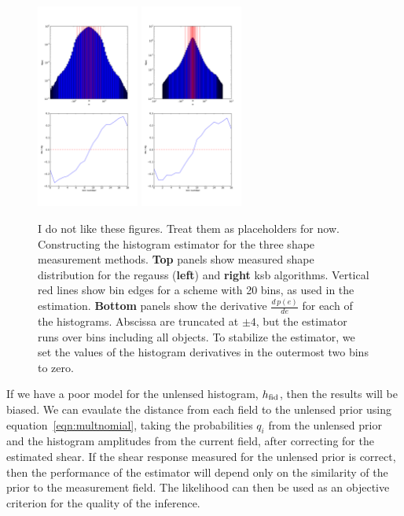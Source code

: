 \documentclass[iop]{emulateapj}
\begin{document}
\begin{figure}
\includegraphics[width=0.3\textwidth]{./Plots/regauss-opt-shear_plots-prior_derivs.png}
\includegraphics[width=0.3\textwidth]{./Plots/ksb-opt-shear_plots-prior_derivs.png}
\caption{I do not like these figures. Treat them as placeholders for now.\\
Constructing the histogram estimator for the three shape measurement methods. {\bf Top} panels show measured shape distribution for the regauss ({\bf left}) and {\bf right} ksb algorithms. Vertical red lines show bin edges for a scheme with 20 bins, as used in the estimation. {\bf Bottom} panels show the derivative $\frac{d\,p(e)}{d{e}}$ for each of the histograms. Abscissa are truncated at $\pm 4$, but the estimator runs over bins including all objects. To stabilize the estimator, we set the values of the histogram derivatives in the outermost two bins to zero.}
\label{fig:estimator}
\end{figure}

If we have a poor model for the unlensed histogram, $h_{\rm fid}$, then the results will be biased. We can evaulate the distance from each field to the unlensed prior using equation~\ref{eqn:multnomial}, taking the probabilities $q_i$ from the unlensed prior and the histogram amplitudes from the current field, {after correcting for the estimated shear}. If the shear response measured for the unlensed prior is correct, then the performance of the estimator will depend only on the similarity of the prior to the measurement field. The likelihood can then be used as an objective criterion for the quality of the inference. 
\end{document}
